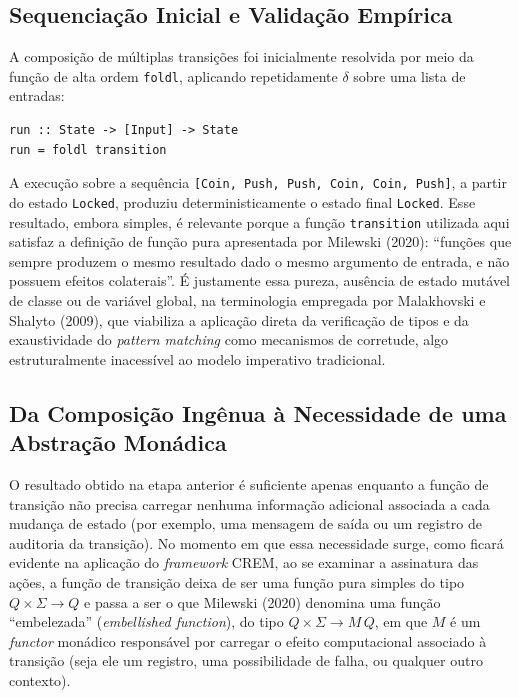 \documentclass[12pt,a4paper]{article}
\begin{document}
\subsection{Sequenciação Inicial e Validação Empírica}

A composição de múltiplas transições foi inicialmente resolvida por meio da função de alta ordem \texttt{foldl}, aplicando repetidamente $\delta$ sobre uma lista de entradas:

\begin{verbatim}
run :: State -> [Input] -> State
run = foldl transition
\end{verbatim}

A execução sobre a sequência \texttt{[Coin, Push, Push, Coin, Coin, Push]}, a partir do estado \texttt{Locked}, produziu deterministicamente o estado final \texttt{Locked}. Esse resultado, embora simples, é relevante porque a função \texttt{transition} utilizada aqui satisfaz a definição de função pura apresentada por Milewski (2020): ``funções que sempre produzem o mesmo resultado dado o mesmo argumento de entrada, e não possuem efeitos colaterais''. É justamente essa pureza, ausência de estado mutável de classe ou de variável global, na terminologia empregada por Malakhovski e Shalyto (2009), que viabiliza a aplicação direta da verificação de tipos e da exaustividade do \textit{pattern matching} como mecanismos de corretude, algo estruturalmente inacessível ao modelo imperativo tradicional.

\subsection{Da Composição Ingênua à Necessidade de uma Abstração Monádica}

O resultado obtido na etapa anterior é suficiente apenas enquanto a função de transição não precisa carregar nenhuma informação adicional associada a cada mudança de estado (por exemplo, uma mensagem de saída ou um registro de auditoria da transição). No momento em que essa necessidade surge, como ficará evidente na aplicação do \textit{framework} CREM, ao se examinar a assinatura das ações, a função de transição deixa de ser uma função pura simples do tipo $Q \times \Sigma \to Q$ e passa a ser o que Milewski (2020) denomina uma função ``embelezada'' (\textit{embellished function}), do tipo $Q \times \Sigma \to M\,Q$, em que $M$ é um \textit{functor} monádico responsável por carregar o efeito computacional associado à transição (seja ele um registro, uma possibilidade de falha, ou qualquer outro contexto).
\end{document}
